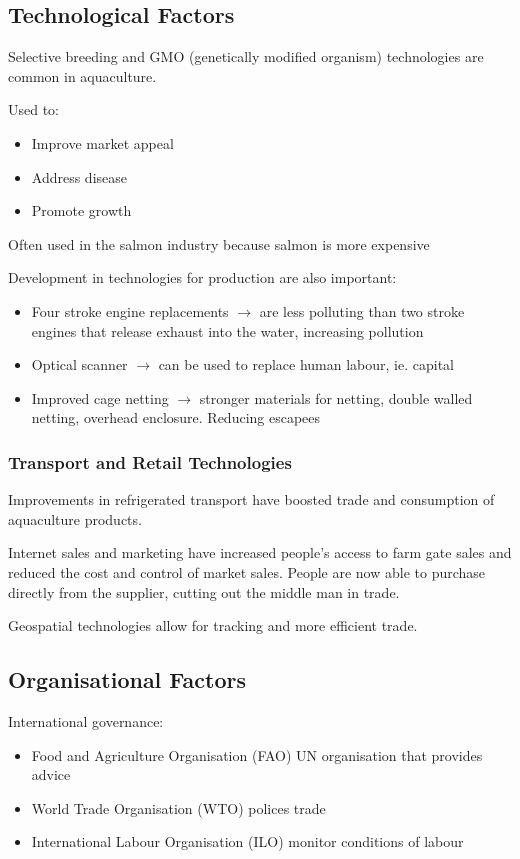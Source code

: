 		\subsection{Technological Factors} \label{11/11/2024}
			Selective breeding and GMO (genetically modified organism) technologies are common in aquaculture.

			Used to:
			\begin{itemize}
				\item Improve market appeal
				\item Address disease
				\item Promote growth
			\end{itemize}

			Often used in the salmon industry because salmon is more expensive

			Development in technologies for production are also important:
			\begin{itemize}
				\item Four stroke engine replacements $\rightarrow$ are less polluting than two stroke engines that release exhaust into the water, increasing pollution
				\item Optical scanner $\rightarrow$ can be used to replace human labour, ie. capital
				\item Improved cage netting $\rightarrow$ stronger materials for netting, double walled netting, overhead enclosure. Reducing escapees
			\end{itemize}

			\subsubsection{Transport and Retail Technologies}
				Improvements in refrigerated transport have boosted trade and consumption of aquaculture products.

				Internet sales and marketing have increased people's access to farm gate sales and reduced the cost and control of market sales. People are now able to purchase directly from the supplier, cutting out the middle man in trade.

				Geospatial technologies allow for tracking and more efficient trade.

		\subsection{Organisational Factors}
			International governance:
			\begin{itemize}
				\item Food and Agriculture Organisation (FAO) UN organisation that provides advice
				\item World Trade Organisation (WTO) polices trade
				\item International Labour Organisation (ILO) monitor conditions of labour
			\end{itemize}

